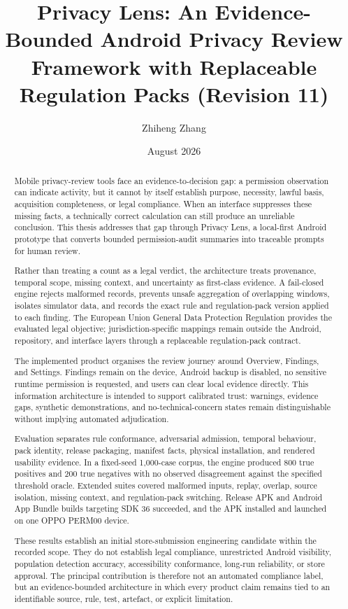 \documentclass[11pt,a4paper]{article}
\title{Privacy Lens: An Evidence-Bounded Android Privacy Review Framework with Replaceable Regulation Packs (Revision 11)}
\author{Zhiheng Zhang}
\date{August 2026}
\begin{document}
\maketitle
\begin{abstract}
Mobile privacy-review tools face an evidence-to-decision gap: a permission observation can indicate activity, but it cannot by itself establish purpose, necessity, lawful basis, acquisition completeness, or legal compliance. When an interface suppresses these missing facts, a technically correct calculation can still produce an unreliable conclusion. This thesis addresses that gap through Privacy Lens, a local-first Android prototype that converts bounded permission-audit summaries into traceable prompts for human review.

Rather than treating a count as a legal verdict, the architecture treats provenance, temporal scope, missing context, and uncertainty as first-class evidence. A fail-closed engine rejects malformed records, prevents unsafe aggregation of overlapping windows, isolates simulator data, and records the exact rule and regulation-pack version applied to each finding. The European Union General Data Protection Regulation provides the evaluated legal objective; jurisdiction-specific mappings remain outside the Android, repository, and interface layers through a replaceable regulation-pack contract.

The implemented product organises the review journey around Overview, Findings, and Settings. Findings remain on the device, Android backup is disabled, no sensitive runtime permission is requested, and users can clear local evidence directly. This information architecture is intended to support calibrated trust: warnings, evidence gaps, synthetic demonstrations, and no-technical-concern states remain distinguishable without implying automated adjudication.

Evaluation separates rule conformance, adversarial admission, temporal behaviour, pack identity, release packaging, manifest facts, physical installation, and rendered usability evidence. In a fixed-seed 1,000-case corpus, the engine produced 800 true positives and 200 true negatives with no observed disagreement against the specified threshold oracle. Extended suites covered malformed inputs, replay, overlap, source isolation, missing context, and regulation-pack switching. Release APK and Android App Bundle builds targeting SDK 36 succeeded, and the APK installed and launched on one OPPO PERM00 device.

These results establish an initial store-submission engineering candidate within the recorded scope. They do not establish legal compliance, unrestricted Android visibility, population detection accuracy, accessibility conformance, long-run reliability, or store approval. The principal contribution is therefore not an automated compliance label, but an evidence-bounded architecture in which every product claim remains tied to an identifiable source, rule, test, artefact, or explicit limitation.
\end{abstract}
\end{document}
